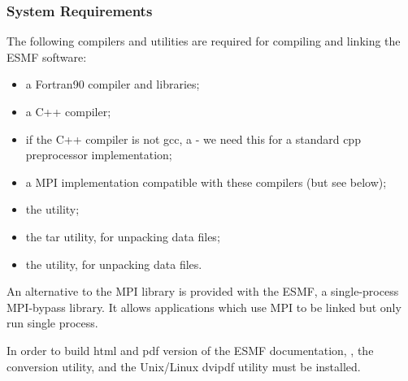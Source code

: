
\subsubsection{System Requirements}
\label{sec:systemreq}

The following compilers and utilities are required for compiling and 
linking the ESMF software:
\begin{itemize}
\item a Fortran90 compiler and libraries;
\item a C++ compiler;
\item if the C++ compiler is not gcc, a  - we need this for a 
standard cpp preprocessor implementation;
\item a MPI implementation compatible with these compilers (but see below);
\item the  utility; 
\item the tar utility, for unpacking data files;
\item the  utility, for unpacking data files.
\end{itemize} 

An alternative to the MPI library is provided with the ESMF,
a single-process MPI-bypass library.  It allows applications which
use MPI to be linked but only run single process.

In order to build html and pdf version of the ESMF documentation, 
, the  conversion utility, and the Unix/Linux dvipdf utility must be installed.







